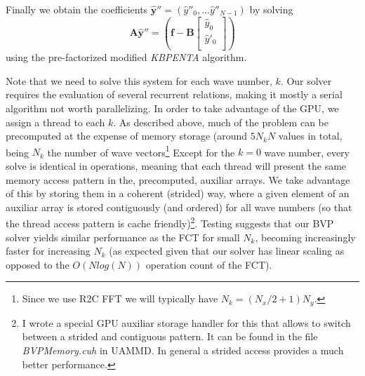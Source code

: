 \documentclass[twoside,openright,titlepage,numbers=noenddot,%
headinclude,footinclude,cleardoublepage=empty,abstract=on,
BCOR=5mm,fontsize=11pt, dvipsnames, paper=b5
]{scrreprt}
\newcommand{\uammd}{\gls{UAMMD}\xspace}
\newcommand{\gpu}{\gls{GPU}\xspace}
\newcommand{\fou}[1]{\widehat{#1}}
\begin{document}
Finally we obtain the coefficients $\fou{\bm{y}}''=(\fou{y}''_0, \dots \fou{y}''_{N-1})$ by solving
\begin{equation}
\bm{A}\fou{\bm{y}}''=\left(\bm{f}-\bm{B}\begin{bmatrix}   \fou{y}_0 \\ \fou{y}'_0\\ \end{bmatrix}\right)
\end{equation}
using the pre-factorized modified \emph{KBPENTA} algorithm.

Note that we need to solve this system for each wave number, $k$. Our solver requires the evaluation of several recurrent relations, making it mostly a serial algorithm not worth parallelizing. In order to take advantage of the \gpu, we assign a thread to each $k$. As described above, much of the problem can be precomputed at the expense of memory storage (around $5N_kN$ values in total, being $N_k$ the number of wave vectors\footnote{Since we use R2C \gls{FFT} we will typically have $N_k=(N_x/2+1)N_y$.}
Except for the $k=0$ wave number, every solve is identical in operations, meaning that each thread will present the same memory access pattern in the, precomputed, auxiliar arrays. We take advantage of this by storing them in a coherent (strided) way, where a given element of an auxiliar array is stored contiguously (and ordered) for all wave numbers (so that the thread access pattern is cache friendly)\footnote{I wrote a special \gpu auxiliar storage handler for this that allows to switch between a strided and contiguous pattern. It can be found in the file \emph{BVPMemory.cuh} in \uammd. In general a strided access provides a much better performance.}. Testing suggests that our \gls{BVP} solver yields similar performance as the \gls{FCT} for small $N_k$, becoming increasingly faster for increasing $N_k$ (as expected given that our solver has linear scaling as opposed to the $O(Nlog(N))$ operation count of the \gls{FCT}).

%
%
\end{document}
